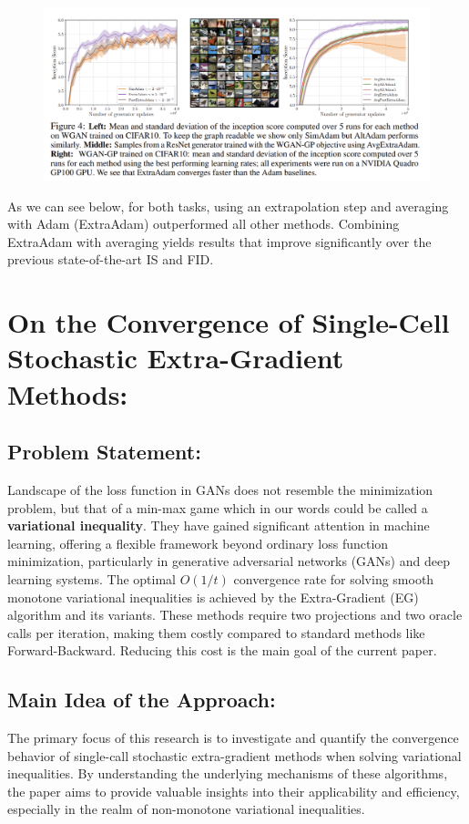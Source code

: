 \documentclass[11pt]{article}
\begin{document}
\begin{enumerate}
\begin{figure}[!htb]
			\label{fig:lab}
		\end{figure}
		\begin{figure}[!htb]
			\centering
			\includegraphics[scale=1]{../../pictures/pic5.png}
			\label{fig:l}
		\end{figure}
		
		As we can see below, for both tasks, using an extrapolation step and averaging with Adam (ExtraAdam) outperformed all other methods. Combining ExtraAdam with averaging yields results that improve significantly over the previous state-of-the-art IS and FID.
	\end{enumerate}

\section{On the Convergence of Single-Cell Stochastic Extra-Gradient Methods:}

	\subsection{Problem Statement:}
        Landscape of the loss function in GANs does not resemble the minimization problem, but that of a min-max game which in our words could be called a \textbf{variational inequality}. They have gained significant attention in machine learning, offering a flexible framework beyond ordinary loss function minimization, particularly in generative adversarial networks (GANs) and deep learning systems. The optimal $O(1/t)$ convergence rate for solving smooth monotone variational inequalities is achieved by the Extra-Gradient (EG) algorithm and its variants. These methods require two projections and two oracle calls per iteration, making them costly compared to standard methods like Forward-Backward. Reducing this cost is the main goal of the current paper.
	
	\subsection{Main Idea of the Approach:}
        The primary focus of this research is to investigate and quantify the convergence behavior of single-call stochastic extra-gradient methods when solving variational inequalities. By understanding the underlying mechanisms of these algorithms, the paper aims to provide valuable insights into their applicability and efficiency, especially in the realm of non-monotone variational inequalities.
	
\end{document}
